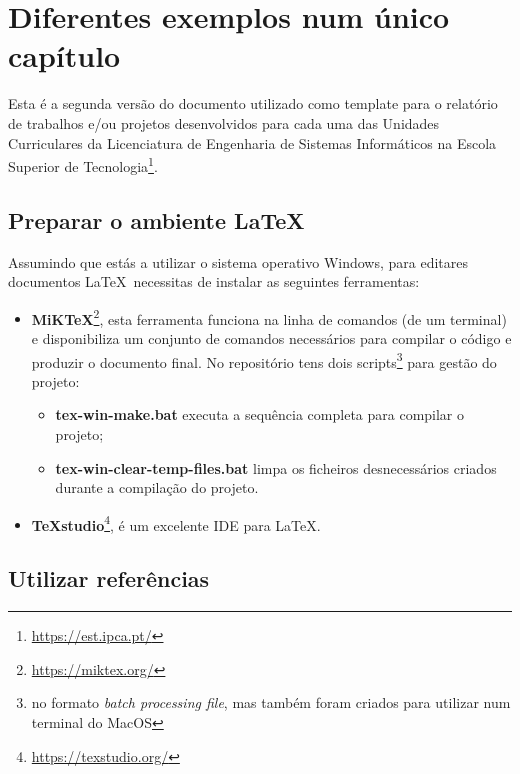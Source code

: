 \chapter{\label{key:latexsample}Diferentes exemplos num único capítulo}

Esta é a segunda versão do documento utilizado como template para o relatório de trabalhos e/ou projetos desenvolvidos para cada uma das Unidades Curriculares da Licenciatura de Engenharia de Sistemas Informáticos na Escola Superior de Tecnologia\footnote{\url{https://est.ipca.pt/}}.


\noindent{}


\section{Preparar o ambiente LaTeX}

Assumindo que estás a utilizar o sistema operativo Windows, para editares documentos \LaTeX\ necessitas de instalar as seguintes ferramentas:
\begin{itemize}
	\item \textbf{MiKTeX}\footnote{\url{https://miktex.org/}}, esta ferramenta funciona na linha de comandos (de um terminal) e disponibiliza um conjunto de comandos necessários para compilar o código e produzir o documento final. No repositório tens dois scripts\footnote{no formato \textit{batch processing file}, mas também foram criados para utilizar num terminal do MacOS} para gestão do projeto:
	\begin{itemize}
		\item \textbf{tex-win-make.bat} executa a sequência completa para compilar o projeto;
		\item \textbf{tex-win-clear-temp-files.bat} limpa os ficheiros desnecessários criados durante a compilação do projeto.
	\end{itemize}
	\item \textbf{TeXstudio}\footnote{\url{https://texstudio.org/}}, é um excelente IDE para \LaTeX.
\end{itemize}


\section{Utilizar referências}

